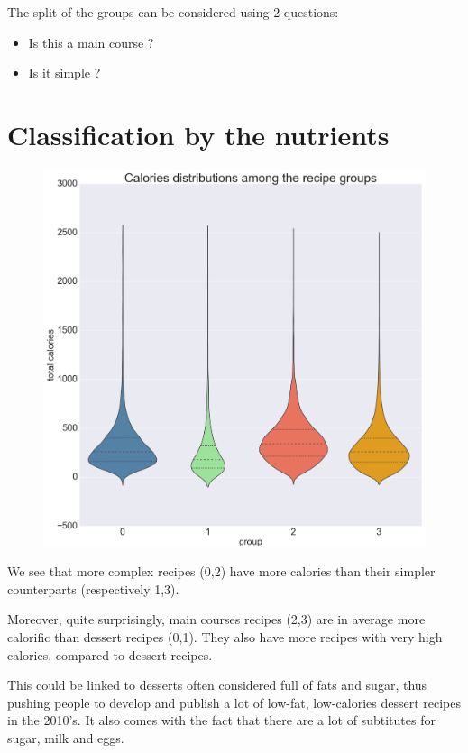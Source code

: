 \documentclass[11pt]{article}
\begin{document}
The split of the groups can be considered using 2 questions:
\begin{itemize}
	\item Is this a main course ?
	\item Is it simple ?
\end{itemize}

\section{Classification by the nutrients}

\begin{figure}[!h]
	\includegraphics[width=\columnwidth]{../total_kcal_distrib-r.png}
	\caption{}
	\label{fig:1}
\end{figure}

We see that more complex recipes (0,2) have more calories than their simpler counterparts (respectively 1,3).

Moreover, quite surprisingly, main courses recipes (2,3) are in average more calorific than dessert recipes (0,1). They also have more recipes with very high calories, compared to dessert recipes.

This could be linked to desserts often considered full of fats and sugar, thus pushing people to develop and publish a lot of low-fat, low-calories dessert recipes in the 2010's. It also comes with the fact that there are a lot of subtitutes for sugar, milk and eggs.
\end{document}
